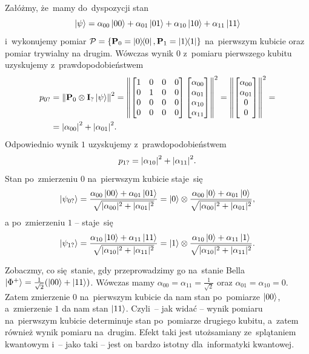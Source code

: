 Załóżmy, że~mamy do~dyspozycji stan
$$
	\ket{\psi} = \alpha_{00}\ket{00} + \alpha_{01}\ket{01} + \alpha_{10}\ket{10} + \alpha_{11}\ket{11}
$$
i~wykonujemy pomiar $\mathcal{P}=\{\mathbf{P}_0=\ketbra{0}{0},\mathbf{P}_1=\ketbra{1}{1}\}$
na~pierwszym kubicie oraz pomiar trywialny na drugim.
Wówczas wynik $0$ z~pomiaru pierwszego kubitu uzyskujemy z~prawdopodobieństwem
\begin{align*}
	p_{0?} & = \norm{\mathbf{P}_0\otimes\mathbf{I}_? \ket{\psi}}^2 =
	\norm{\begin{bmatrix} 1 & 0 & 0 & 0 \\  0 & 1 & 0 & 0 \\  0 & 0 & 0 & 0 \\  0 & 0 & 0 & 0 \end{bmatrix}
		\begin{bmatrix} \alpha_{00} \\ \alpha_{01} \\ \alpha_{10} \\ \alpha_{11} \end{bmatrix}}^2 =
	\norm{\begin{bmatrix} \alpha_{00} \\ \alpha_{01} \\ 0 \\ 0 \end{bmatrix}}^2  =                       \\
	       & = \abs{\alpha_{00}}^2 + \abs{\alpha_{01}}^2.
\end{align*}
Odpowiednio wynik $1$ uzyskujemy z~prawdopodobieństwem $$p_{1?} = \abs{\alpha_{10}}^2 + \abs{\alpha_{11}}^2.$$
Stan po~zmierzeniu $0$ na~pierwszym kubicie staje~się
$$
	\ket{\psi_{0?}}=
	\frac{\alpha_{00}\ket{00} + \alpha_{01}\ket{01}}{\sqrt{|\alpha_{00}|^2 + |\alpha_{01}|^2}} =
	\ket{0}\otimes\frac{\alpha_{00}\ket{0} + \alpha_{01}\ket{0}}{\sqrt{|\alpha_{00}|^2 + |\alpha_{01}|^2}},
$$
a po~zmierzeniu $1$ -- staje~się
$$
	\ket{\psi_{1?}}=
	\frac{\alpha_{10}\ket{10} + \alpha_{11}\ket{11}}{\sqrt{|\alpha_{10}|^2 + |\alpha_{11}|^2}} =
	\ket{1}\otimes\frac{\alpha_{10}\ket{0} + \alpha_{11}\ket{1}}{\sqrt{|\alpha_{10}|^2 + |\alpha_{11}|^2}}.
$$

Zobaczmy, co się~stanie, gdy przeprowadzimy go na~stanie Bella
$\ket{\Phi^+}=\frac{1}{\sqrt{2}}(\ket{00}+\ket{11})$. Wówczas mamy
$\alpha_{00}=\alpha_{11}=\frac{1}{\sqrt{2}}$ oraz $\alpha_{01}=\alpha_{10}=0$. Zatem zmierzenie $0$
na~pierwszym kubicie da nam stan po~pomiarze $\ket{00}$, a~zmierzenie $1$ da nam
stan $\ket{11}$. Czyli~-- jak widać -- wynik pomiaru na~pierwszym kubicie determinuje
stan po~pomiarze drugiego kubitu, a~zatem również wynik pomiaru na~drugim. Efekt
taki jest utożsamiany ze~splątaniem kwantowym i~-- jako taki -- jest on bardzo istotny dla~informatyki kwantowej.

